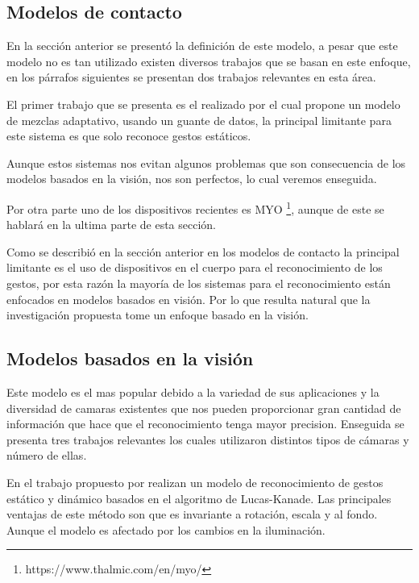 \subsection{Modelos de contacto}
 
En la sección anterior se presentó la definición de este modelo, a pesar que este modelo no es tan utilizado existen diversos trabajos que se basan en este enfoque, en los párrafos siguientes se presentan dos trabajos relevantes en esta área. 

El primer trabajo que se presenta es el realizado por \citep{Yoon2012} el cual propone un modelo de mezclas adaptativo, usando un guante de datos, la principal limitante para este sistema es que solo reconoce gestos estáticos. 

Aunque estos sistemas nos evitan algunos problemas que son consecuencia de los modelos basados en la visión, nos son perfectos, lo cual veremos enseguida.  

Por otra parte uno de los dispositivos recientes es MYO \footnote{https://www.thalmic.com/en/myo/}, aunque de este se hablar\'a en la ultima parte de esta secci\'on. 

Como se describi\'o en la secci\'on anterior en los modelos de contacto la principal limitante es el uso de dispositivos en el cuerpo para el reconocimiento de los gestos, por esta raz\'on la mayor\'ia de los sistemas para el reconocimiento están enfocados en modelos basados en visi\'on. Por lo que resulta natural que la investigaci\'on propuesta tome un enfoque basado en la visi\'on.

\subsection{Modelos basados en la visi\'on}   

Este modelo es el mas popular debido a la variedad de sus aplicaciones y la diversidad de camaras existentes que nos pueden proporcionar gran cantidad de información que hace que el reconocimiento tenga mayor precision. Enseguida se presenta tres  trabajos relevantes los cuales utilizaron distintos tipos de cámaras y número de ellas. 

En el trabajo propuesto por \cite{Premaratne2013} realizan un modelo de reconocimiento de gestos est\'atico y din\'amico basados en el algoritmo de Lucas-Kanade. Las principales ventajas de este m\'etodo son que es invariante a rotaci\'on, escala y al fondo. Aunque el modelo es afectado por los cambios en la iluminaci\'on.

